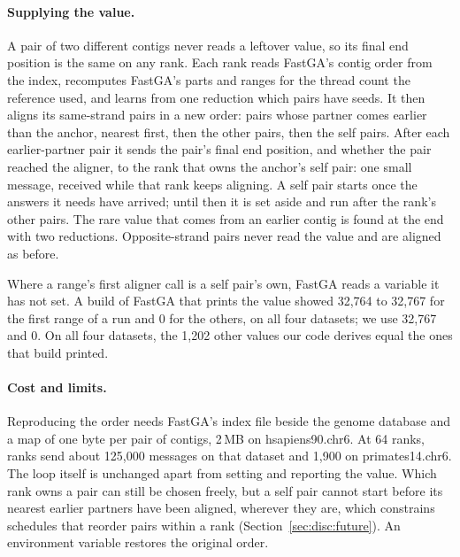 \paragraph{Supplying the value.} A pair of two different contigs never
reads a leftover value, so its final end position is the same on any rank.
Each rank reads FastGA's contig order from the index, recomputes FastGA's
parts and ranges for the thread count the reference used, and learns from
one reduction which pairs have seeds. It then aligns its same-strand pairs
in a new order: pairs whose partner comes earlier than the anchor, nearest
first, then the other pairs, then the self pairs. After each
earlier-partner pair it sends the pair's final end position, and whether
the pair reached the aligner, to the rank that owns the anchor's self pair:
one small message, received while that rank keeps aligning. A self pair
starts once the answers it needs have arrived; until then it is set aside
and run after the rank's other pairs. The rare value that comes from an
earlier contig is found at the end with two reductions. Opposite-strand
pairs never read the value and are aligned as before.

Where a range's first aligner call is a self pair's own, FastGA reads a
variable it has not set. A build of FastGA that prints the value showed
32,764 to 32,767 for the first range of a run and 0 for the others, on all
four datasets; we use 32,767 and 0. On all four datasets, the 1,202 other
values our code derives equal the ones that build printed.

\paragraph{Cost and limits.} Reproducing the order needs FastGA's index file beside
the genome database and a map of one byte per pair of contigs, 2\,MB on
hsapiens90.chr6. At 64 ranks, ranks send about 125,000 messages on that
dataset and 1,900 on primates14.chr6. The loop itself is unchanged apart
from setting and reporting the value. Which rank owns a pair can still be
chosen freely, but a self pair cannot start before its nearest earlier
partners have been aligned, wherever they are, which constrains schedules
that reorder pairs within a rank (Section~\ref{sec:disc:future}). An
environment variable restores the original order.
